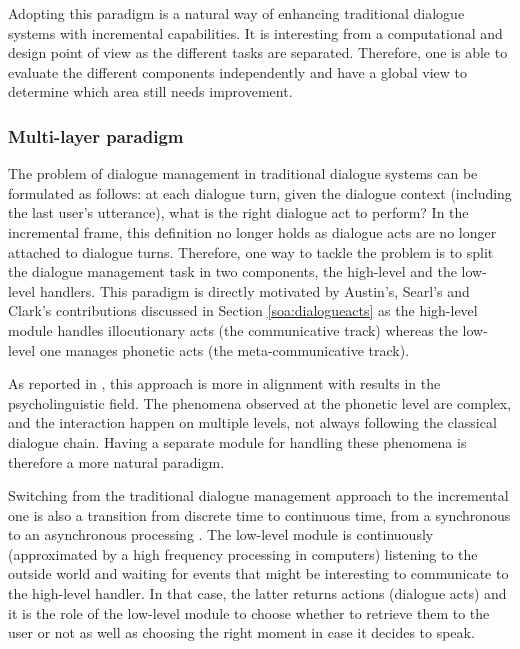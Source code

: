 			Adopting this paradigm is a natural way of enhancing traditional dialogue systems with incremental capabilities. It is interesting from a computational and design point of view as the different tasks are separated. Therefore, one is able to evaluate the different components independently \cite{Baumann2011} and have a global view to determine which area still needs improvement.

		\subsubsection{Multi-layer paradigm}
		
			The problem of dialogue management in traditional dialogue systems can be formulated as follows: at each dialogue turn, given the dialogue context (including the last user's utterance), what is the right dialogue act to perform? In the incremental frame, this definition no longer holds as dialogue acts are no longer attached to dialogue turns. Therefore, one way to tackle the problem is to split the dialogue management task in two components, the high-level and the low-level handlers. This paradigm is directly motivated by Austin's, Searl's and Clark's contributions discussed in Section \ref{soa:dialogueacts} as the high-level module handles illocutionary acts (the communicative track) whereas the low-level one manages phonetic acts (the meta-communicative track).
				
				As reported in \cite{Lemon2003}, this approach is more in alignment with results in the psycholinguistic field. The phenomena observed at the phonetic level are complex, and the interaction happen on multiple levels, not always following the classical dialogue chain. Having a separate module for handling these phenomena is therefore a more natural paradigm.
				
				Switching from the traditional dialogue management approach to the incremental one is also a transition from discrete time to continuous time, from a synchronous to an asynchronous processing \cite{Raux2007}. The low-level module is continuously (approximated by a high frequency processing in computers) listening to the outside world and waiting for events that might be interesting to communicate to the high-level handler. In that case, the latter returns actions (dialogue acts) and it is the role of the low-level module to choose whether to retrieve them to the user or not as well as choosing the right moment in case it decides to speak.
				

